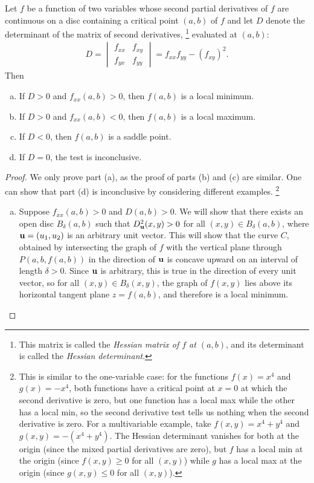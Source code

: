\documentclass[12pt,letterpaper,reqno]{article}
\numberwithin{equation}{section}
\newcommand{\bu}{{\bf u}}
\begin{document}
{\begin{thm}
	Let $f$ be a function of two variables whose second partial derivatives of $f$ are continuous on a disc containing a critical point $(a,b)$ of $f$ and let $D$ denote the determinant of the matrix of second derivatives, \footnote{This matrix is called the \emph{Hessian matrix of $f$ at $(a,b)$}, and its determinant is called the \emph{Hessian determinant}.} evaluated at $(a,b)$:
	\begin{align*}
		D=\begin{vmatrix}
		f_{xx} & f_{xy} \\
		f_{yx}  & f_{yy}
	\end{vmatrix}=f_{xx}f_{yy}-(f_{xy})^2.
	\end{align*}
	Then
\begin{enumerate}[(a)]
		\item If $D>0$ and $f_{xx}(a,b)>0$, then $f(a,b)$ is a local minimum.
		\item If $D>0$ and $f_{xx}(a,b)<0$, then $f(a,b)$ is a local maximum.
		\item If $D<0$, then $f(a,b)$ is a saddle point.
		\item If $D=0$, the test is inconclusive.
	\end{enumerate}
\end{thm}

\begin{proof}
	We only prove part (a), as the proof of parts (b) and (c) are similar. One can show that part (d) is inconclusive by considering different examples. \footnote{This is similar to the one-variable case: for the functions $f(x)=x^4$ and $g(x)=-x^4$, both functions have a critical point at $x=0$ at which the second derivative is zero, but one function has a local max while the other has a local min, so the second derivative test tells us nothing when the second derivative is zero. For a multivariable example, take $f(x,y)=x^4+y^4$ and $g(x,y)=-(x^4+y^4)$. The Hessian determinant vanishes for both at the origin (since the mixed partial derivatives are zero), but $f$ has a local min at the origin (since $f(x,y) \geq 0$ for all $(x,y)$) while $g$ has a local max at the origin (since $g(x,y) \leq 0$ for all $(x,y)$).}
	\begin{enumerate}[(a)]
		\item Suppose $f_{xx}(a,b)>0$ and $D(a,b)>0$. We will show that there exists an open disc $B_\delta(a,b)$ such that $D^2_\bu(x,y)>0$ for all $(x,y) \in B_\delta(a,b)$, where $\bu=(u_1,u_2)$ is an arbitrary unit vector. This will show that the curve $C$, obtained by intersecting the graph of $f$ with the vertical plane through $P(a,b,f(a,b))$ in the direction of $\bu$ is concave upward on an interval of length $\delta>0$. Since $\bu$ is arbitrary, this is true in the direction of every unit vector, so for all $(x,y) \in B_\delta(x,y)$, the graph of $f(x,y)$ lies above its horizontal tangent plane $z=f(a,b)$, and therefore is a local minimum.
		 

\end{enumerate}
\end{proof}}
\end{document}
